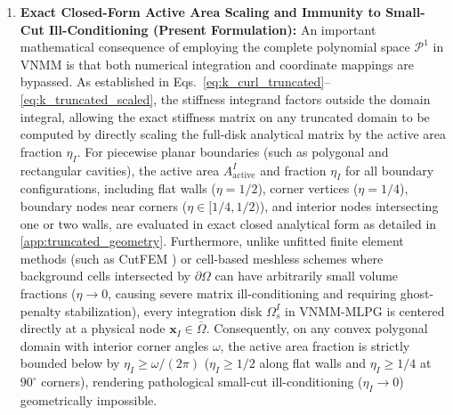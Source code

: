 \documentclass[preprint,12pt]{elsarticle}
\begin{document}
\begin{enumerate}
    \item \textbf{Exact Closed-Form Active Area Scaling and Immunity to Small-Cut Ill-Conditioning (Present Formulation):}
          An important mathematical consequence of employing the complete polynomial space $\mathcal{P}^1$ in VNMM is that both numerical integration and coordinate mappings are bypassed. As established in Eqs.~\eqref{eq:k_curl_truncated}--\eqref{eq:k_truncated_scaled}, the stiffness integrand factors outside the domain integral, allowing the exact stiffness matrix on any truncated domain to be computed by directly scaling the full-disk analytical matrix by the active area fraction $\eta_I$.
          For piecewise planar boundaries (such as polygonal and rectangular cavities), the active area $A_{\mathrm{active}}^I$ and fraction $\eta_I$ for all boundary configurations, including flat walls ($\eta = 1/2$), corner vertices ($\eta = 1/4$), boundary nodes near corners ($\eta \in [1/4, 1/2)$), and interior nodes intersecting one or two walls, are evaluated in exact closed analytical form as detailed in \ref{app:truncated_geometry}.
          Furthermore, unlike unfitted finite element methods (such as CutFEM \cite{hansbo2002unfitted}) or cell-based meshless schemes where background cells intersected by $\partial\Omega$ can have arbitrarily small volume fractions ($\eta \to 0$, causing severe matrix ill-conditioning and requiring ghost-penalty stabilization), every integration disk $\Omega_s^I$ in VNMM-MLPG is centered directly at a physical node $\mathbf{x}_I \in \overline{\Omega}$. Consequently, on any convex polygonal domain with interior corner angles $\omega$, the active area fraction is strictly bounded below by $\eta_I \ge \omega/(2\pi)$ ($\eta_I \ge 1/2$ along flat walls and $\eta_I \ge 1/4$ at $90^\circ$ corners), rendering pathological small-cut ill-conditioning ($\eta_I \to 0$) geometrically impossible.
\end{enumerate}
\end{document}
